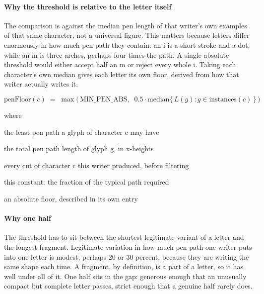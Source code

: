 \paragraph{Why the threshold is relative to the letter itself}
The comparison is against the median pen length of that writer's own examples of that same character, not a universal figure. This matters because letters differ enormously in how much pen path they contain: an i is a short stroke and a dot, while an m is three arches, perhaps four times the path. A single absolute threshold would either accept half an m or reject every whole i. Taking each character's own median gives each letter its own floor, derived from how that writer actually writes it.


\begin{equation}
\mathrm{penFloor}(c) \;=\; \max\Big(\, \mathrm{MIN\_PEN\_ABS},\;\; 0.5 \cdot \mathrm{median}\big\{\,L(g) : g \in \mathrm{instances}(c)\,\big\} \,\Big)
\end{equation}

\noindent where
\begin{description}[leftmargin=2.4em,style=nextline,font=\normalfont\ttfamily]\setlength\itemsep{1pt}
  \item[{$\mathrm{penFloor}(c)$}] \normalfont the least pen path a glyph of character c may have
  \item[{$L(g)$}] \normalfont the total pen path length of glyph g, in x-heights
  \item[{$\mathrm{instances}(c)$}] \normalfont every cut of character c this writer produced, before filtering
  \item[{$0.5$}] \normalfont this constant: the fraction of the typical path required
  \item[{$\mathrm{MIN\_PEN\_ABS}$}] \normalfont an absolute floor, described in its own entry
\end{description}

\paragraph{Why one half}
The threshold has to sit between the shortest legitimate variant of a letter and the longest fragment. Legitimate variation in how much pen path one writer puts into one letter is modest, perhaps 20 or 30 percent, because they are writing the same shape each time. A fragment, by definition, is a part of a letter, so it has well under all of it. One half sits in the gap: generous enough that an unusually compact but complete letter passes, strict enough that a genuine half rarely does.


